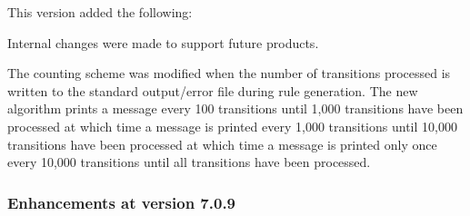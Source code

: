 This version added the following:
\begin{indenteditems}
\item Internal changes were made to support future products.
\item The counting scheme was modified when the number of transitions
      processed is written to the standard output/error file during
      rule generation.    The new algorithm prints a message every
      100 transitions until 1,000 transitions have been processed
      at which time a message is printed every
      1,000 transitions until 10,000 transitions have been processed
      at which time a message is printed only once every 10,000
      transitions until all transitions have been processed.
\end{indenteditems}

\subsubsection{Enhancements at version 7.0.9}

